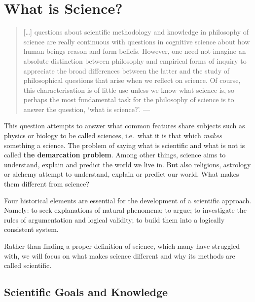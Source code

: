 \documentclass[
]{book}
\begin{document}
\hypertarget{what-is-science}{%
\section{What is Science?}\label{what-is-science}}

\begin{quote}
{[}\ldots{]} questions about scientific methodology and knowledge in philosophy of science are really continuous with questions in cognitive science about how human beings reason and form beliefs. However, one need not imagine an absolute distinction between philosophy and empirical forms of inquiry to appreciate the broad differences between the latter and the study of philosophical questions that arise when we reflect on science.
Of course, this characterisation is of little use unless we know what science is, so perhaps the most fundamental task for the philosophy of science is to answer the question, `what is science?'. --- \citep{ladyman2012understanding}
\end{quote}

This question attempts to answer what common features share subjects such as physics or biology to be called sciences, i.e.~what it is that which \emph{makes} something a science. The problem of saying what is scientific and what is not is called \textbf{the demarcation problem}. Among other things, science aims to understand, explain and predict the world we live in. But also religions, astrology or alchemy attempt to understand, explain or predict our world. What makes them different from science?

Four historical elements are essential for the development of a scientific approach. Namely: to seek explanations of natural phenomena; to argue; to investigate the rules of argumentation and logical validity; to build them into a logically consistent system. \citep{johansson2016philosophy}

Rather than finding a proper definition of science, which many have struggled with, we will focus on what makes science different and why its methods are called scientific.

\hypertarget{scientific-goals-and-knowledge}{%
\subsection{Scientific Goals and Knowledge}\label{scientific-goals-and-knowledge}}
\end{document}
